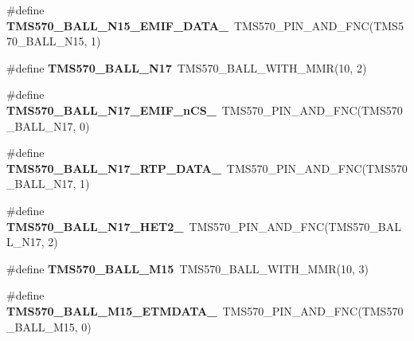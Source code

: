 \begin{DoxyCompactItemize}
\item 
\mbox{\label{tms570ls3137zwt-pins_8h_a3d3232f1397b917678aac6c181baaa22}} 
\#define {\bfseries T\+M\+S570\+\_\+\+B\+A\+L\+L\+\_\+\+N15\+\_\+\+E\+M\+I\+F\+\_\+\+D\+A\+T\+A\+\_}~T\+M\+S570\+\_\+\+P\+I\+N\+\_\+\+A\+N\+D\+\_\+\+F\+NC(T\+M\+S570\+\_\+\+B\+A\+L\+L\+\_\+\+N15, 1)
\item 
\mbox{\label{tms570ls3137zwt-pins_8h_af656f3dd46093de3265995e4f61e23eb}} 
\#define {\bfseries T\+M\+S570\+\_\+\+B\+A\+L\+L\+\_\+\+N17}~T\+M\+S570\+\_\+\+B\+A\+L\+L\+\_\+\+W\+I\+T\+H\+\_\+\+M\+MR(10, 2)
\item 
\mbox{\label{tms570ls3137zwt-pins_8h_a878b9434f109d0fab84aa23f7b3cde25}} 
\#define {\bfseries T\+M\+S570\+\_\+\+B\+A\+L\+L\+\_\+\+N17\+\_\+\+E\+M\+I\+F\+\_\+n\+C\+S\+\_}~T\+M\+S570\+\_\+\+P\+I\+N\+\_\+\+A\+N\+D\+\_\+\+F\+NC(T\+M\+S570\+\_\+\+B\+A\+L\+L\+\_\+\+N17, 0)
\item 
\mbox{\label{tms570ls3137zwt-pins_8h_a127775dd743701f844b10fcbc059601f}} 
\#define {\bfseries T\+M\+S570\+\_\+\+B\+A\+L\+L\+\_\+\+N17\+\_\+\+R\+T\+P\+\_\+\+D\+A\+T\+A\+\_}~T\+M\+S570\+\_\+\+P\+I\+N\+\_\+\+A\+N\+D\+\_\+\+F\+NC(T\+M\+S570\+\_\+\+B\+A\+L\+L\+\_\+\+N17, 1)
\item 
\mbox{\label{tms570ls3137zwt-pins_8h_a24b7a94ea4e2ceca0002a1a8bdf08659}} 
\#define {\bfseries T\+M\+S570\+\_\+\+B\+A\+L\+L\+\_\+\+N17\+\_\+\+H\+E\+T2\+\_}~T\+M\+S570\+\_\+\+P\+I\+N\+\_\+\+A\+N\+D\+\_\+\+F\+NC(T\+M\+S570\+\_\+\+B\+A\+L\+L\+\_\+\+N17, 2)
\item 
\mbox{\label{tms570ls3137zwt-pins_8h_aea686635fd948c0124ff0323afc6760e}} 
\#define {\bfseries T\+M\+S570\+\_\+\+B\+A\+L\+L\+\_\+\+M15}~T\+M\+S570\+\_\+\+B\+A\+L\+L\+\_\+\+W\+I\+T\+H\+\_\+\+M\+MR(10, 3)
\item 
\mbox{\label{tms570ls3137zwt-pins_8h_adc50016a8e9c0fad14581e4855a6e377}} 
\#define {\bfseries T\+M\+S570\+\_\+\+B\+A\+L\+L\+\_\+\+M15\+\_\+\+E\+T\+M\+D\+A\+T\+A\+\_}~T\+M\+S570\+\_\+\+P\+I\+N\+\_\+\+A\+N\+D\+\_\+\+F\+NC(T\+M\+S570\+\_\+\+B\+A\+L\+L\+\_\+\+M15, 0)
\item 

\end{DoxyCompactItemize}
